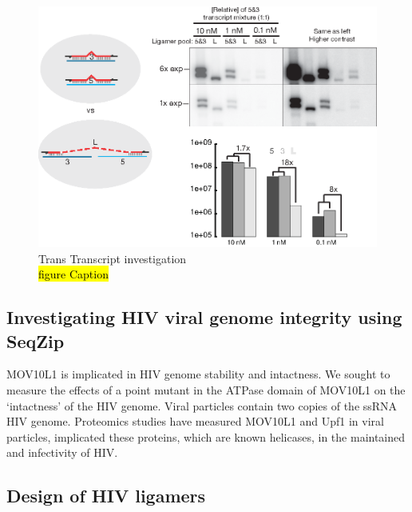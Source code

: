 \begin{figure}[htbp]
	\centering 
	\includegraphics{Figures/Chapter2/TransRNAWithSeqZip.eps}
	\caption[Trans Transcript investigation]
	{
		Trans Transcript investigation\\
		\hl{figure Caption}
	}
	\label{fig:Ligation product and RNA integrity}
\end{figure}

\subsection{Investigating HIV viral genome integrity using SeqZip}



MOV10L1 is implicated in HIV genome stability and intactness. We sought to measure the effects of a point mutant in the ATPase domain of MOV10L1 on the ‘intactness’ of the HIV genome. Viral particles contain two copies of the ssRNA HIV genome. Proteomics studies have measured MOV10L1 and Upf1 in viral particles, implicated these proteins, which are known helicases, in the maintained and infectivity of HIV.

\subsection{Design of HIV ligamers}

